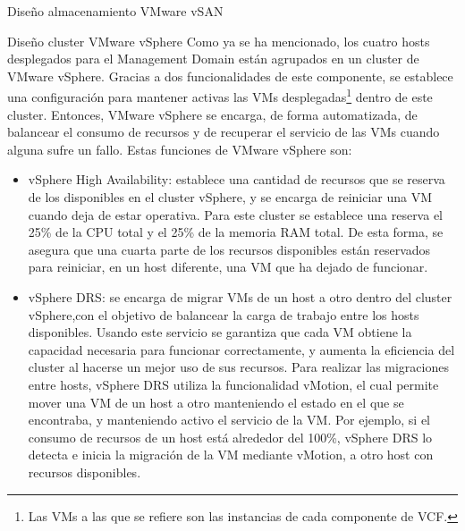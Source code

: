 \begin{subsubsection}{Diseño almacenamiento VMware vSAN}

\end{subsubsection}
    
\begin{subsubsection}{Diseño cluster VMware vSphere}
Como ya se ha mencionado, los cuatro hosts desplegados para el Management Domain están agrupados en un cluster de VMware vSphere. Gracias a dos funcionalidades de este componente, se establece una configuración para mantener activas las VMs desplegadas\footnote{Las VMs a las que se refiere son las instancias de cada componente de VCF.} dentro de este cluster. Entonces, VMware vSphere se encarga, de forma automatizada, de balancear el consumo de recursos y de recuperar el servicio de las VMs cuando alguna sufre un fallo. Estas funciones de VMware vSphere son:
\begin{itemize}
  \item vSphere High Availability: establece una cantidad de recursos que se reserva de los disponibles en el cluster vSphere, y se encarga de reiniciar una VM cuando deja de estar operativa. Para este cluster se establece una reserva el 25\% de la CPU total y el 25\% de la memoria RAM total. De esta forma, se asegura que una cuarta parte de los recursos disponibles están reservados para reiniciar, en un host diferente, una VM que ha dejado de funcionar.
  
  \item vSphere DRS: se encarga de migrar VMs de un host a otro dentro del cluster vSphere,con el objetivo de balancear la carga de trabajo entre los hosts disponibles. Usando este servicio se garantiza que cada VM obtiene la capacidad necesaria para funcionar correctamente, y aumenta la eficiencia del cluster al hacerse un mejor uso de sus recursos. Para realizar las migraciones entre hosts, vSphere DRS utiliza la funcionalidad vMotion, el cual permite mover una VM de un host a otro manteniendo el estado en el que se encontraba, y manteniendo activo el servicio de la VM. Por ejemplo, si el consumo de recursos de un host está alrededor del 100\%, vSphere DRS lo detecta e inicia la migración de la VM mediante vMotion, a otro host con recursos disponibles. 
\end{itemize}


\end{subsubsection}
